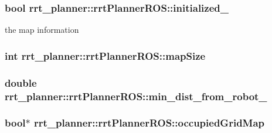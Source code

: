 \subsubsection[{\texorpdfstring{initialized\+\_\+}{initialized_}}]{\setlength{\rightskip}{0pt plus 5cm}bool rrt\+\_\+planner\+::rrt\+Planner\+R\+O\+S\+::initialized\+\_\+}\hypertarget{classrrt__planner_1_1rrtPlannerROS_a5442c8d9c8e584229b9fb16eb53ee43e}{}\label{classrrt__planner_1_1rrtPlannerROS_a5442c8d9c8e584229b9fb16eb53ee43e}


the map information 

\subsubsection[{\texorpdfstring{map\+Size}{mapSize}}]{\setlength{\rightskip}{0pt plus 5cm}int rrt\+\_\+planner\+::rrt\+Planner\+R\+O\+S\+::map\+Size}\hypertarget{classrrt__planner_1_1rrtPlannerROS_a9d70e19d3be684a5df111ae5a3740b80}{}\label{classrrt__planner_1_1rrtPlannerROS_a9d70e19d3be684a5df111ae5a3740b80}
\subsubsection[{\texorpdfstring{min\+\_\+dist\+\_\+from\+\_\+robot\+\_\+}{min_dist_from_robot_}}]{\setlength{\rightskip}{0pt plus 5cm}double rrt\+\_\+planner\+::rrt\+Planner\+R\+O\+S\+::min\+\_\+dist\+\_\+from\+\_\+robot\+\_\+}\hypertarget{classrrt__planner_1_1rrtPlannerROS_a969e711b8d5f06808309d80dda5b2326}{}\label{classrrt__planner_1_1rrtPlannerROS_a969e711b8d5f06808309d80dda5b2326}
\subsubsection[{\texorpdfstring{occupied\+Grid\+Map}{occupiedGridMap}}]{\setlength{\rightskip}{0pt plus 5cm}bool$\ast$ rrt\+\_\+planner\+::rrt\+Planner\+R\+O\+S\+::occupied\+Grid\+Map}\hypertarget{classrrt__planner_1_1rrtPlannerROS_a05a6e887d0cce7d410e25d151b30212c}{}\label{classrrt__planner_1_1rrtPlannerROS_a05a6e887d0cce7d410e25d151b30212c}


